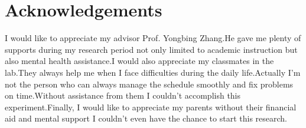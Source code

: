 \documentclass[a4paper,11pt]{report}
\begin{document}
\chapter{Acknowledgements}
    I would like to appreciate my advisor Prof. Yongbing Zhang.He gave me plenty of supports during my research period not only limited to academic instruction but also mental health assistance.I would also appreciate my classmates in the lab.They always help me when I face difficulties during the daily life.Actually I'm not the person who can always manage the schedule smoothly and fix problems on time.Without assistance from them I couldn't accomplish this experiment.Finally, I would like to appreciate my parents without their financial aid and mental support I couldn't even have the chance to start this research.




\renewcommand{\bibname}{Bibliography}
%
%
\end{document}
